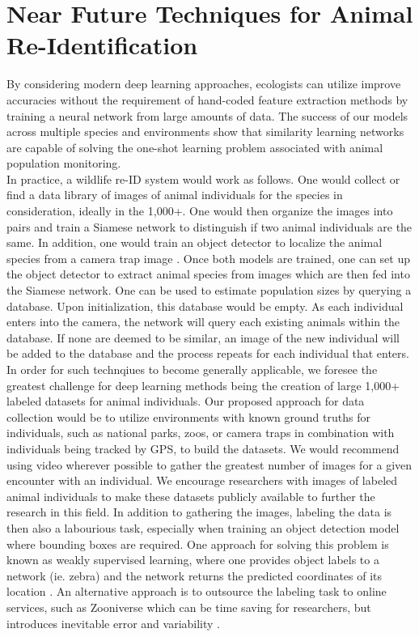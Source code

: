 \documentclass[11pt]{article}
\begin{document}
\section*{Near Future Techniques for Animal Re-Identification}
By considering modern deep learning approaches, ecologists can utilize improve accuracies without the requirement of hand-coded feature extraction methods by training a neural network from large amounts of data. The success of our models across multiple species and environments show that similarity learning networks are capable of solving the one-shot learning problem associated with animal population monitoring. 
\newline
\\
In practice, a wildlife re-ID system would work as follows. One would collect or find a data library of images of animal individuals for the species in consideration, ideally in the 1,000+. One would then organize the images into pairs and train a Siamese network to distinguish if two animal individuals are the same. In addition, one would train an object detector to localize the animal species from a camera trap image \cite{schneider2018deep}. Once both models are trained, one can set up the object detector to extract animal species from images which are then fed into the Siamese network. One can be used to estimate population sizes by querying a database. Upon initialization, this database would be empty. As each individual enters into the camera, the network will query each existing animals within the database. If none are deemed to be similar, an image of the new individual will be added to the database and the process repeats for each individual that enters. 
\newline
\\
In order for such technqiues to become generally applicable, we foresee the greatest challenge for deep learning methods being the creation of large 1,000+ labeled datasets for animal individuals. Our proposed approach for data collection would be to utilize environments with known ground truths for individuals, such as national parks, zoos, or camera traps in combination with individuals being tracked by GPS, to build the datasets. We would recommend using video wherever possible to gather the greatest number of images for a given encounter with an individual. We encourage researchers with images of labeled animal individuals to make these datasets publicly available to further the research in this field. In addition to gathering the images, labeling the data is then also a labourious task, especially when training an object detection model where bounding boxes are required. One approach for solving this problem is known as weakly supervised learning, where one provides object labels to a network (ie. zebra) and the network returns the predicted coordinates of its location \cite{zhou2017brief}. An alternative approach is to outsource the labeling task to online services, such as Zooniverse which can be time saving for researchers, but introduces inevitable error and variability \cite{simpson2014zooniverse}. 
\end{document}
